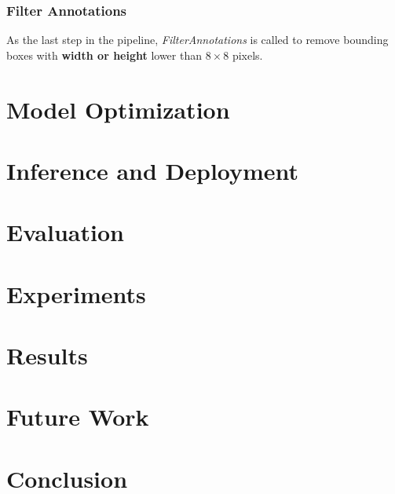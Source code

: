 \subsection*{Filter Annotations}

As the last step in the pipeline, \textit{FilterAnnotations} is called to remove
bounding boxes with \textbf{width or height} lower than $8 \times 8$ pixels.






\chapter{Model Optimization}




\chapter{Inference and Deployment}




\chapter{Evaluation}







\chapter{Experiments}

\chapter{Results}





\chapter{Future Work}





\chapter{Conclusion}



% 